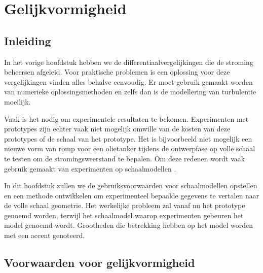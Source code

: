 \chapter{Gelijkvormigheid}
\label{sec:Gelijkvormigheid}

	\section{Inleiding}
	\label{sec:Gelijkvormigheid Inleiding}
In het vorige hoofdstuk hebben we de differentiaalvergelijkingen die de stroming beheersen afgeleid. Voor praktische problemen is een oplossing voor deze vergelijkingen vinden alles behalve eenvoudig. Er moet gebruik gemaakt worden van numerieke oplossingsmethoden en zelfs dan is de modellering van turbulentie moeilijk.

Vaak is het nodig om experimentele resultaten te bekomen. Experimenten met prototypes zijn echter vaak niet mogelijk omwille van de kosten van deze prototypes of de schaal van het prototype. Het is bijvoorbeeld niet mogelijk een nieuwe vorm van romp voor een olietanker tijdens de ontwerpfase op volle schaal te testen om de stromingsweerstand te bepalen. Om deze redenen wordt vaak gebruik gemaakt van experimenten op schaalmodellen \cite{Tropea2007}.

In dit hoofdstuk zullen we de gebruiksvoorwaarden voor schaalmodellen opstellen en een methode ontwikkelen om experimenteel bepaalde gegevens te vertalen naar de volle schaal geometrie. Het werkelijke probleem zal vanaf nu het prototype genoemd worden, terwijl het schaalmodel waarop experimenten gebeuren het model genoemd wordt. Grootheden die betrekking hebben op het model worden met een accent genoteerd.

	\section{Voorwaarden voor gelijkvormigheid}
	\label{sec:Voorwaarden voor gelijkvormigheid}
